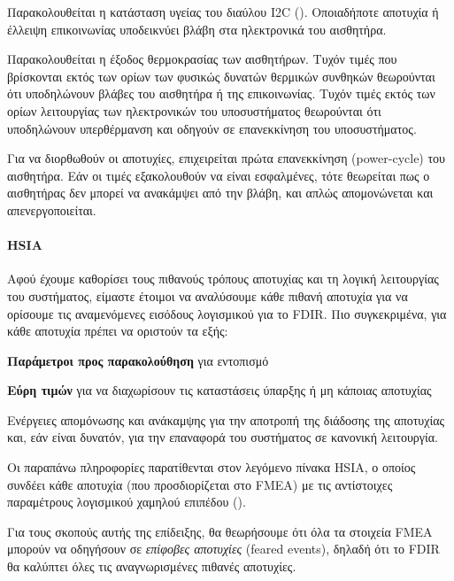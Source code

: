 \documentclass[a4paper,nobib]{tufte-book}
\begin{document}
\begin{compactenum}
	\item Παρακολουθείται η κατάσταση υγείας του διαύλου \ac{I2C} (). Οποιαδήποτε αποτυχία ή έλλειψη επικοινωνίας υποδεικνύει βλάβη στα ηλεκτρονικά του αισθητήρα.
	\item Παρακολουθείται η έξοδος θερμοκρασίας των αισθητήρων. Τυχόν τιμές που βρίσκονται εκτός των ορίων των φυσικώς δυνατών θερμικών συνθηκών θεωρούνται ότι υποδηλώνουν βλάβες του αισθητήρα ή της επικοινωνίας. Τυχόν τιμές εκτός των ορίων λειτουργίας των ηλεκτρονικών του υποσυστήματος θεωρούνται ότι υποδηλώνουν υπερθέρμανση και οδηγούν σε επανεκκίνηση του υποσυστήματος.
	\item Για να διορθωθούν οι αποτυχίες, επιχειρείται πρώτα επανεκκίνηση (power-cycle) του αισθητήρα. Εάν οι τιμές εξακολουθούν να είναι εσφαλμένες, τότε θεωρείται πως ο αισθητήρας δεν μπορεί να ανακάμψει από την βλάβη, και απλώς απομονώνεται και απενεργοποιείται.
\end{compactenum}

\paragraph{\acl{HSIA}}

Αφού έχουμε καθορίσει τους πιθανούς τρόπους αποτυχίας και τη λογική λειτουργίας του συστήματος, είμαστε έτοιμοι να αναλύσουμε κάθε πιθανή αποτυχία για να ορίσουμε τις αναμενόμενες εισόδους λογισμικού για το \ac{FDIR}. Πιο συγκεκριμένα, για κάθε αποτυχία πρέπει να οριστούν τα εξής: \autocite[84]{SAVOIR-HB-003}
\begin{compactitem}
	\item \textbf{Παράμετροι προς παρακολούθηση} για εντοπισμό
	\item \textbf{Εύρη τιμών} για να διαχωρίσουν τις καταστάσεις ύπαρξης ή μη κάποιας αποτυχίας
	\item Ενέργειες απομόνωσης και ανάκαμψης για την αποτροπή της διάδοσης της αποτυχίας και, εάν είναι δυνατόν, για την επαναφορά του συστήματος σε κανονική λειτουργία.
\end{compactitem}

Οι παραπάνω πληροφορίες παρατίθενται στον λεγόμενο πίνακα \acf{HSIA}, ο οποίος συνδέει κάθε αποτυχία (που προσδιορίζεται στο \acl{FMEA}) με τις αντίστοιχες παραμέτρους λογισμικού χαμηλού επιπέδου ().

Για τους σκοπούς αυτής της επίδειξης, θα θεωρήσουμε ότι όλα τα στοιχεία \ac{FMEA} μπορούν να οδηγήσουν σε \emph{επίφοβες αποτυχίες} (feared events), δηλαδή ότι το \ac{FDIR} θα καλύπτει όλες τις αναγνωρισμένες πιθανές αποτυχίες.
\end{document}
